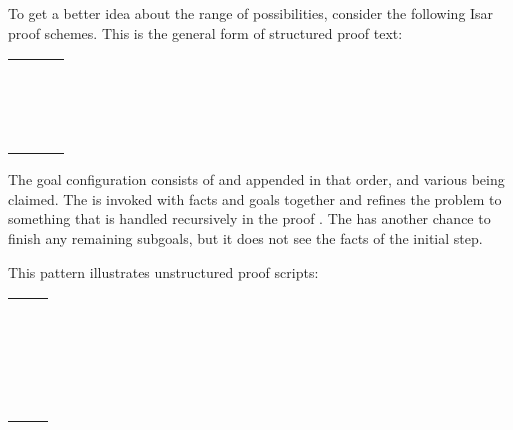 \begin{isabellebody}
\begin{isamarkuptext}
  To get a better idea about the range of possibilities, consider the
  following Isar proof schemes.  This is the general form of
  structured proof text:

  \medskip
  \begin{tabular}{l}
  \hyperlink{command.from}{\mbox{\isa{\isacommand{from}}}}~\isa{facts\isaliteral{5C3C5E7375623E}{}\isactrlsub {\isadigit{1}}}~\hyperlink{command.have}{\mbox{\isa{\isacommand{have}}}}~\isa{props}~\hyperlink{command.using}{\mbox{\isa{\isacommand{using}}}}~\isa{facts\isaliteral{5C3C5E7375623E}{}\isactrlsub {\isadigit{2}}} \\
  \hyperlink{command.proof}{\mbox{\isa{\isacommand{proof}}}}~\isa{{\isaliteral{28}{\isacharparenleft}}initial{\isaliteral{5F}{\isacharunderscore}}method{\isaliteral{29}{\isacharparenright}}} \\
  \quad\isa{body} \\
  \hyperlink{command.qed}{\mbox{\isa{\isacommand{qed}}}}~\isa{{\isaliteral{28}{\isacharparenleft}}terminal{\isaliteral{5F}{\isacharunderscore}}method{\isaliteral{29}{\isacharparenright}}} \\
  \end{tabular}
  \medskip

  The goal configuration consists of  and
   appended in that order, and various  being claimed.  The  is invoked
  with facts and goals together and refines the problem to something
  that is handled recursively in the proof .  The  has another chance to finish any remaining
  subgoals, but it does not see the facts of the initial step.

  \medskip This pattern illustrates unstructured proof scripts:

  \medskip
  \begin{tabular}{l}
  \hyperlink{command.have}{\mbox{\isa{\isacommand{have}}}}~\isa{props} \\
  \quad\hyperlink{command.using}{\mbox{\isa{\isacommand{using}}}}~\isa{facts\isaliteral{5C3C5E7375623E}{}\isactrlsub {\isadigit{1}}}~\hyperlink{command.apply}{\mbox{\isa{\isacommand{apply}}}}~\isa{method\isaliteral{5C3C5E7375623E}{}\isactrlsub {\isadigit{1}}} \\
  \quad\hyperlink{command.apply}{\mbox{\isa{\isacommand{apply}}}}~\isa{method\isaliteral{5C3C5E7375623E}{}\isactrlsub {\isadigit{2}}} \\
  \quad\hyperlink{command.using}{\mbox{\isa{\isacommand{using}}}}~\isa{facts\isaliteral{5C3C5E7375623E}{}\isactrlsub {\isadigit{3}}}~\hyperlink{command.apply}{\mbox{\isa{\isacommand{apply}}}}~\isa{method\isaliteral{5C3C5E7375623E}{}\isactrlsub {\isadigit{3}}} \\
  \quad\hyperlink{command.done}{\mbox{\isa{\isacommand{done}}}} \\
  \end{tabular}
  \medskip


\end{isamarkuptext}
\end{isabellebody}
